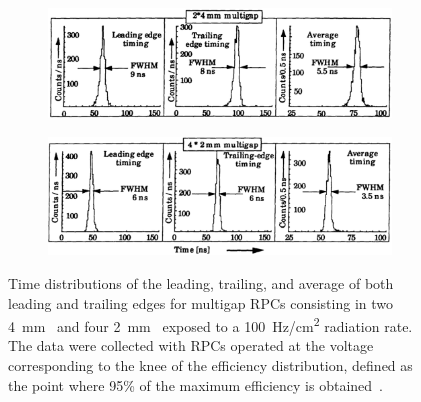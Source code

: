 \endgroup
	
	\begin{figure}[H]
		\begin{subfigure}{\linewidth}
			\centering
			\includegraphics[width = \plotwidth]{fig/chapt3/MRPC-2-4mm-time-res.png}
			\caption{\label{fig:MRPCTimeRes:A}}
		\end{subfigure}
		\begin{subfigure}{\linewidth}
			\centering
			\includegraphics[width = \plotwidth]{fig/chapt3/MRPC-4-2mm-time-res.png}
			\caption{\label{fig:MRPCTimeRes:B}}
		\end{subfigure}
		\caption{\label{fig:MRPCTimeRes} Time distributions of the leading, trailing, and average of both leading and trailing edges for multigap RPCs consisting in two \SI{4}{mm}~ and four \SI{2}{mm}~ exposed to a \SI{100}{Hz/cm^2} radiation rate. The data were collected with RPCs operated at the voltage corresponding to the knee of the efficiency distribution, defined as the point where 95\% of the maximum efficiency is obtained~\cite{WILLIAMS98}.}
	\end{figure}
	
